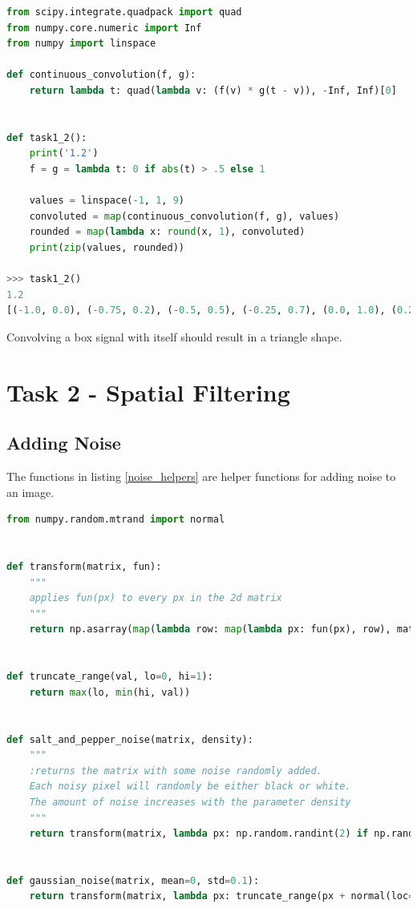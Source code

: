 \begin{lstlisting}[language=Python, label=continous_convolution, caption=Continous convolution]
from scipy.integrate.quadpack import quad
from numpy.core.numeric import Inf
from numpy import linspace

def continuous_convolution(f, g):
    return lambda t: quad(lambda v: (f(v) * g(t - v)), -Inf, Inf)[0]


def task1_2():
    print('1.2')
    f = g = lambda t: 0 if abs(t) > .5 else 1

    values = linspace(-1, 1, 9)
    convoluted = map(continuous_convolution(f, g), values)
    rounded = map(lambda x: round(x, 1), convoluted)
    print(zip(values, rounded))

>>> task1_2()
1.2
[(-1.0, 0.0), (-0.75, 0.2), (-0.5, 0.5), (-0.25, 0.7), (0.0, 1.0), (0.25, 0.7), (0.5, 0.5), (0.75, 0.2), (1.0, 0.0)]
\end{lstlisting}

Convolving a box signal with itself should result in a triangle shape.

\newpage
\section*{Task 2 - Spatial Filtering}

\subsection*{Adding Noise}

The functions in listing \ref{noise_helpers} are helper functions for adding noise to an image.

\begin{lstlisting}[language=Python, label=noise_helpers, caption=Noise Helpers]
from numpy.random.mtrand import normal


def transform(matrix, fun):
    """
    applies fun(px) to every px in the 2d matrix
    """
    return np.asarray(map(lambda row: map(lambda px: fun(px), row), matrix))


def truncate_range(val, lo=0, hi=1):
    return max(lo, min(hi, val))


def salt_and_pepper_noise(matrix, density):
    """
    :returns the matrix with some noise randomly added.
    Each noisy pixel will randomly be either black or white.
    The amount of noise increases with the parameter density
    """
    return transform(matrix, lambda px: np.random.randint(2) if np.random.random() < density else px)


def gaussian_noise(matrix, mean=0, std=0.1):
    return transform(matrix, lambda px: truncate_range(px + normal(loc=mean, scale=std)))
\end{lstlisting}

